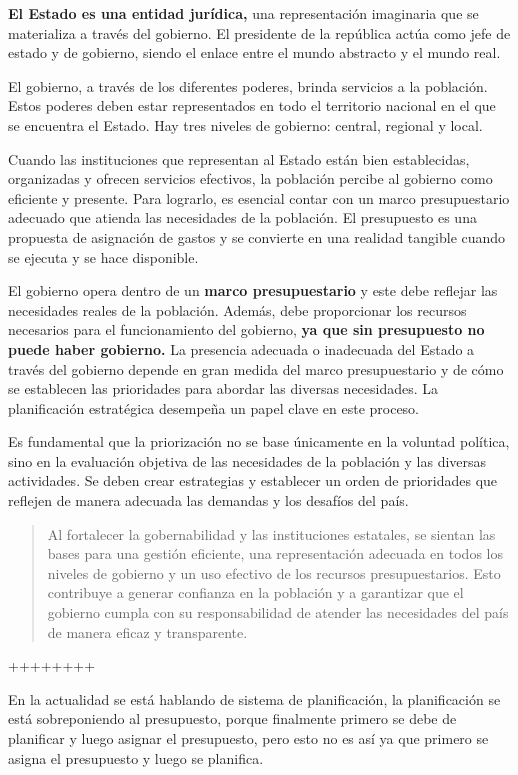 \documentclass[
  letterpaper,
  DIV=11,
  numbers=noendperiod]{scrartcl}
\begin{document}
\textbf{El Estado es una entidad jurídica,} una representación
imaginaria que se materializa a través del gobierno. El presidente de la
república actúa como jefe de estado y de gobierno, siendo el enlace
entre el mundo abstracto y el mundo real.

El gobierno, a través de los diferentes poderes, brinda servicios a la
población. Estos poderes deben estar representados en todo el territorio
nacional en el que se encuentra el Estado. Hay tres niveles de gobierno:
central, regional y local.

Cuando las instituciones que representan al Estado están bien
establecidas, organizadas y ofrecen servicios efectivos, la población
percibe al gobierno como eficiente y presente. Para lograrlo, es
esencial contar con un marco presupuestario adecuado que atienda las
necesidades de la población. El presupuesto es una propuesta de
asignación de gastos y se convierte en una realidad tangible cuando se
ejecuta y se hace disponible.

El gobierno opera dentro de un \textbf{marco presupuestario} y este debe
reflejar las necesidades reales de la población. Además, debe
proporcionar los recursos necesarios para el funcionamiento del
gobierno, \textbf{ya que sin presupuesto no puede haber gobierno.} La
presencia adecuada o inadecuada del Estado a través del gobierno depende
en gran medida del marco presupuestario y de cómo se establecen las
prioridades para abordar las diversas necesidades. La planificación
estratégica desempeña un papel clave en este proceso.

Es fundamental que la priorización no se base únicamente en la voluntad
política, sino en la evaluación objetiva de las necesidades de la
población y las diversas actividades. Se deben crear estrategias y
establecer un orden de prioridades que reflejen de manera adecuada las
demandas y los desafíos del país.

\begin{quote}
Al fortalecer la gobernabilidad y las instituciones estatales, se
sientan las bases para una gestión eficiente, una representación
adecuada en todos los niveles de gobierno y un uso efectivo de los
recursos presupuestarios. Esto contribuye a generar confianza en la
población y a garantizar que el gobierno cumpla con su responsabilidad
de atender las necesidades del país de manera eficaz y transparente.
\end{quote}

++++++++

En la actualidad se está hablando de sistema de planificación, la
planificación se está sobreponiendo al presupuesto, porque finalmente
primero se debe de planificar y luego asignar el presupuesto, pero esto
no es así ya que primero se asigna el presupuesto y luego se planifica.
\end{document}
